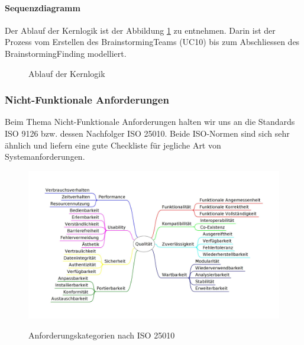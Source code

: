 \paragraph{Sequenzdiagramm}
Der Ablauf der Kernlogik ist der Abbildung \ref{fig:seq-methode635} zu entnehmen. Darin ist der Prozess vom Erstellen des BrainstormingTeams (UC10) bis zum Abschliessen des BrainstormingFinding modelliert.
\begin{figure}[h]
	\centering
	\caption{Ablauf der Kernlogik}
	\label{fig:seq-methode635}
\end{figure}


\subsubsection{Nicht-Funktionale Anforderungen}
Beim Thema Nicht-Funktionale Anforderungen halten wir uns an die Standards ISO 9126\cite{ISO9126} bzw. dessen Nachfolger ISO 25010\cite{ISO9126_ISO25010}. Beide ISO-Normen sind sich sehr ähnlich und liefern eine gute Checkliste für jegliche Art von Systemanforderungen.

\begin{figure}[h]
	\centering
	\includegraphics[width=1\linewidth]{img/anforderungen/quality}
	\caption[Anforderungskategorien nach ISO 25010]{Anforderungskategorien nach  ISO 25010}\cite{ISO25010_Bild}
	\label{fig:ISO 25010}
\end{figure}


